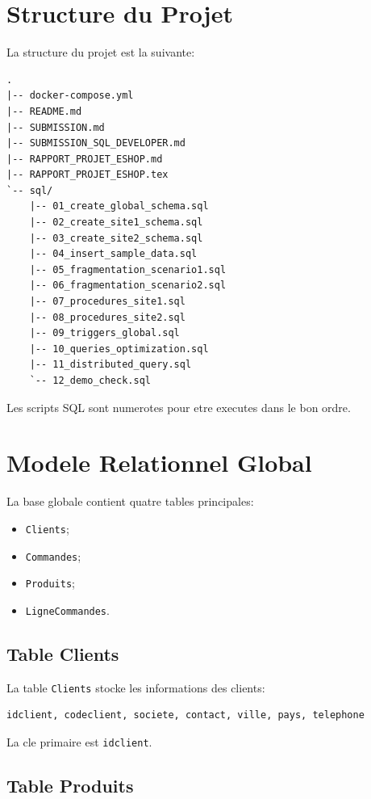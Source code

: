 \documentclass[12pt,a4paper]{report}
\begin{document}
\chapter{Structure du Projet}

La structure du projet est la suivante:

\begin{lstlisting}[style=textstyle]
.
|-- docker-compose.yml
|-- README.md
|-- SUBMISSION.md
|-- SUBMISSION_SQL_DEVELOPER.md
|-- RAPPORT_PROJET_ESHOP.md
|-- RAPPORT_PROJET_ESHOP.tex
`-- sql/
    |-- 01_create_global_schema.sql
    |-- 02_create_site1_schema.sql
    |-- 03_create_site2_schema.sql
    |-- 04_insert_sample_data.sql
    |-- 05_fragmentation_scenario1.sql
    |-- 06_fragmentation_scenario2.sql
    |-- 07_procedures_site1.sql
    |-- 08_procedures_site2.sql
    |-- 09_triggers_global.sql
    |-- 10_queries_optimization.sql
    |-- 11_distributed_query.sql
    `-- 12_demo_check.sql
\end{lstlisting}

Les scripts SQL sont numerotes pour etre executes dans le bon ordre.

\chapter{Modele Relationnel Global}

La base globale contient quatre tables principales:

\begin{itemize}
    \item \texttt{Clients};
    \item \texttt{Commandes};
    \item \texttt{Produits};
    \item \texttt{LigneCommandes}.
\end{itemize}

\section{Table Clients}

La table \texttt{Clients} stocke les informations des clients:

\begin{lstlisting}[style=textstyle]
idclient, codeclient, societe, contact, ville, pays, telephone
\end{lstlisting}

La cle primaire est \texttt{idclient}.

\section{Table Produits}
\end{document}
